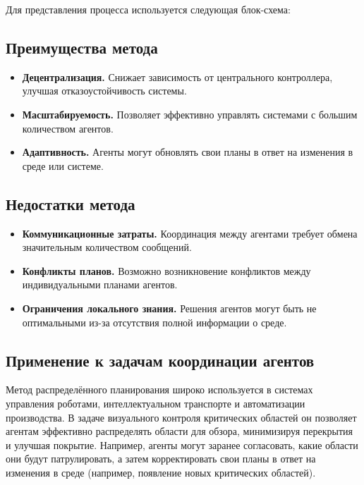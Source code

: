 Для представления процесса используется следующая блок-схема:

\begin{center}
\end{center}

\subsection{Преимущества метода}

\begin{itemize}
	\item \textbf{Децентрализация.} Снижает зависимость от центрального контроллера, улучшая отказоустойчивость системы.
	\item \textbf{Масштабируемость.} Позволяет эффективно управлять системами с большим количеством агентов.
	\item \textbf{Адаптивность.} Агенты могут обновлять свои планы в ответ на изменения в среде или системе.
\end{itemize}

\subsection{Недостатки метода}

\begin{itemize}
	\item \textbf{Коммуникационные затраты.} Координация между агентами требует обмена значительным количеством сообщений.
	\item \textbf{Конфликты планов.} Возможно возникновение конфликтов между индивидуальными планами агентов.
	\item \textbf{Ограничения локального знания.} Решения агентов могут быть не оптимальными из-за отсутствия полной информации о среде.
\end{itemize}

\subsection{Применение к задачам координации агентов}

Метод распределённого планирования широко используется в системах управления роботами, интеллектуальном транспорте и автоматизации производства. В задаче визуального контроля критических областей он позволяет агентам эффективно распределять области для обзора, минимизируя перекрытия и улучшая покрытие. Например, агенты могут заранее согласовать, какие области они будут патрулировать, а затем корректировать свои планы в ответ на изменения в среде (например, появление новых критических областей).

